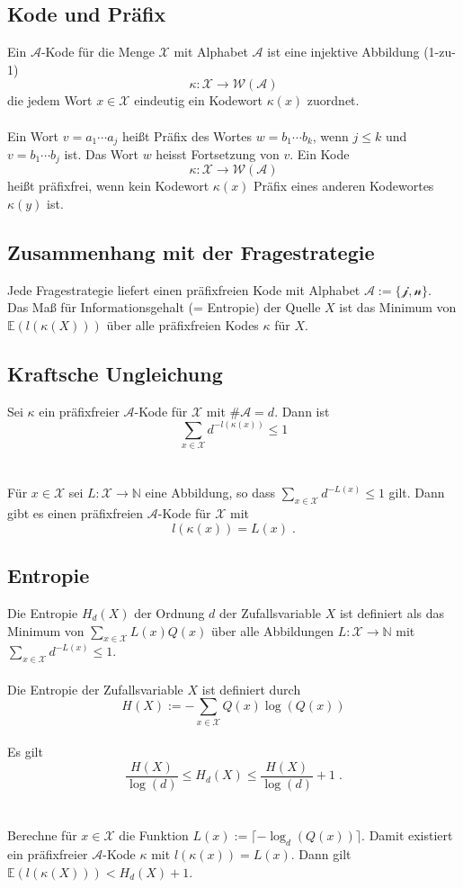 \documentclass[a4paper]{article}
\begin{document}
\subsection{Kode und Präfix}
Ein $\mathcal{A}$-Kode für die Menge $\mathcal{X}$ mit Alphabet $\mathcal{A}$ ist eine injektive Abbildung (1-zu-1)
$$ \kappa : \mathcal{X} \to \mathcal{W} (\mathcal{A})$$
die jedem Wort $x \in \mathcal{X}$ eindeutig ein Kodewort $\kappa(x)$ zuordnet.\\\\
Ein Wort $v = a_1 \cdots a_j$ heißt Präfix des Wortes $w = b_1 \cdots b_k$, wenn $j \leq k$ und $v = b_1 \cdots b_j$ ist. Das Wort $w$ heisst Fortsetzung von $v$. Ein Kode $$ \kappa : \mathcal{X} \to \mathcal{W} (\mathcal{A})$$
 heißt präfixfrei, wenn kein Kodewort $\kappa(x)$ Präfix eines anderen Kodewortes $\kappa(y)$ ist. 

\subsection{Zusammenhang mit der Fragestrategie}
Jede Fragestrategie liefert einen präfixfreien Kode mit Alphabet $\mathcal{A := \{  \text{j} ,\text{n} \}}$.\\
Das Maß für Informationsgehalt (= Entropie) der Quelle $X$ ist das Minimum von $\mathbb{E}(l(\kappa (X)))$ über alle präfixfreien Kodes $\kappa$ für $X$.

\subsection{Kraftsche Ungleichung}
Sei $\kappa$ ein präfixfreier $\mathcal{A}$-Kode für $\mathcal{X}$ mit $\# \mathcal{A} = d$. Dann ist
$$ \sum_{x \in \mathcal{X} }  d^{-l( \kappa(x))} \leq 1$$\\\\
Für $x \in \mathcal{X}$ sei $L : \mathcal{X} \to \mathbb{N}$ eine Abbildung, so dass $ \sum_{x \in \mathcal{X} }  d^{-L(x)} \leq 1$ gilt. Dann gibt es einen präfixfreien  $\mathcal{A}$-Kode für $\mathcal{X}$ mit 
$$ l(\kappa(x)) = L(x) \; .$$

\subsection{Entropie}
Die Entropie $H_d(X)$ der Ordnung $d$ der Zufallsvariable $X$ ist definiert als das Minimum von $\sum_{x \in \mathcal{X} }  L(x) Q(x)$ über alle Abbildungen $L: \mathcal{X} \to \mathbb{N}$ mit \mbox{$\sum_{x \in \mathcal{X} }  d^{-L(x)} \leq 1$.}\\\\
Die Entropie der Zufallsvariable $X$ ist definiert durch 
$$ H(X) := -\sum_{x \in \mathcal{X} }   Q(x) \log(Q(x))$$\\
Es gilt
$$ \frac{H(X)}{\log(d)} \leq H_d(X) \leq \frac{H(X)}{\log(d)} +1 \; .$$\\\\
Berechne für $x \in \mathcal{X}$ die Funktion $L(x) := \lceil -\log_d(Q(x)) \rceil$. Damit existiert ein präfixfreier $\mathcal{A}$-Kode
$\kappa$ mit $l(\kappa(x)) = L(x)$. Dann gilt $\mathbb{E}(l(\kappa(X))) < H_d(X) +1$.
\end{document}
